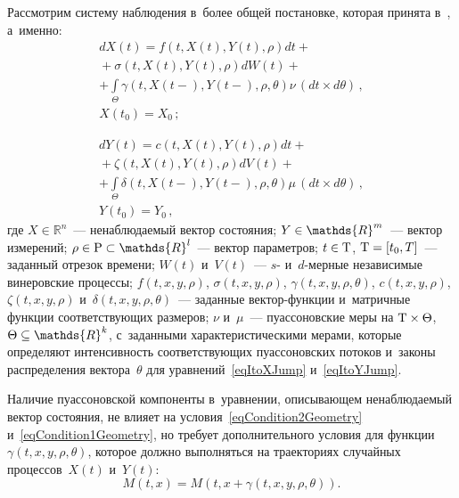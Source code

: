 \begin{multicols}{2}
Рассмотрим систему наблюдения в~более общей постановке, 
которая принята в~\cite{Sin_SSI16, Sin_IP16, SinSinKor_SSI16, SinSinKor_IP17, SinSinSerKor_AiT18}, 
а~именно:
\begin{multline}
\label{eqItoXJump}
  dX(t) = f \left( t,X(t),Y(t),\rho \right) dt + {}\\
  {}+
  \sigma \left( t,X(t),Y(t),\rho \right) dW(t) + {} \\
  + \int\limits_\Theta \gamma \left( t,X(t-),Y(t-),\rho,\theta \right) 
  \nu\,(dt \times d\theta)\,,\\ X\left(t_0\right) = X_0\,;
\end{multline}

\vspace*{-12pt}

\noindent
\begin{multline}
\label{eqItoYJump}
  dY(t) = c \left( t,X(t),Y(t),\rho \right) dt + {}\\
  {}+
  \zeta \left( t,X(t),Y(t),\rho \right) dV(t) + {} \\
  + \int\limits_\Theta \delta \left( t,X(t-),Y(t-),\rho,\theta \right) \mu\,
  (dt \times d\theta)\,,\\ Y\left(t_0\right) = Y_0\,,
\end{multline}
где $X \in \mathds{R}^n$~--- ненаблюдаемый вектор состояния; 
$Y \hm\in \mathds{R}^m$~--- 
вектор измерений; $\rho \hm\in \mathrm{P} \hm\subset \mathds{R}^l$~--- 
вектор параметров; $t \hm\in \mathrm{T}$, $\mathrm{T}\hm = [t_0,T]$~--- 
заданный отрезок времени; $W(t)$ и~$V(t)$~--- $s$- и~$d$-мер\-ные 
независимые винеровские процессы; $f(t,x,y,\rho)$, $\sigma(t,x,y,\rho)$, 
$\gamma(t,x,y,\rho,\theta)$, $c(t,x,y,\rho)$, $\zeta(t,x,y,\rho)$ 
и~$\delta(t,x,y,\rho,\theta)$~--- заданные век\-тор-функ\-ции и~матричные 
функции соответствующих размеров; $\nu$ и~$\mu$~--- пуассоновские\linebreak
 меры 
на $\mathrm{T} \hm\times \Theta$, $\Theta \hm\subseteq \mathds{R}^k$, 
с~заданными характери\-сти\-че\-ски\-ми мерами, которые определяют интен\-сив\-ность 
со\-от\-вет\-ст\-ву\-ющих пуассоновских потоков и~законы распределения вектора~$\theta$ 
для уравнений~\eqref{eqItoXJump} и~\eqref{eqItoYJump}.

Наличие пуассоновской компоненты в~уравнении, описывающем ненаблюдаемый 
вектор состояния, не влияет на условия~\eqref{eqCondition2Geometry} 
и~\eqref{eqCondition1Geometry}, но требует дополнительного условия для 
функции $\gamma(t,x,y,\rho,\theta)$, которое должно выполняться на 
траекториях случайных процессов~$X(t)$ и~$Y(t)$:
$$
  M(t,x) = M \left( t,x + \gamma(t,x,y,\rho,\theta) \right).
$$


\end{multicols}
